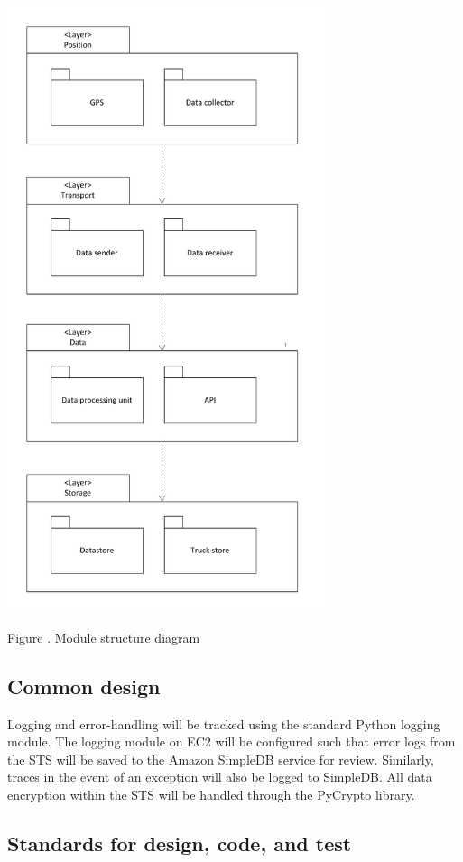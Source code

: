 \documentclass[a4paper,11pt]{report}
\newcommand{\mycaption}[1]{
  \addtocounter{figures}{1}
  Figure \arabic{figures}. #1
}
\begin{document}
\begin{center}
  \includegraphics[width=0.7\textwidth]{figures/module_structure}\\
  \mycaption{Module structure diagram}
\end{center}

\subsection{Common design}
\label{sec:common-design}

Logging and error-handling will be tracked using the standard Python logging 
module. The logging module on EC2 will be configured such that error logs from
the STS will be saved to the Amazon SimpleDB service for review. Similarly,
traces in the event of an exception will also be logged to SimpleDB. All 
data encryption within the STS will be handled through the PyCrypto library.

\subsection{Standards for design, code, and test}
\label{sec:stand-design-code}
\end{document}
